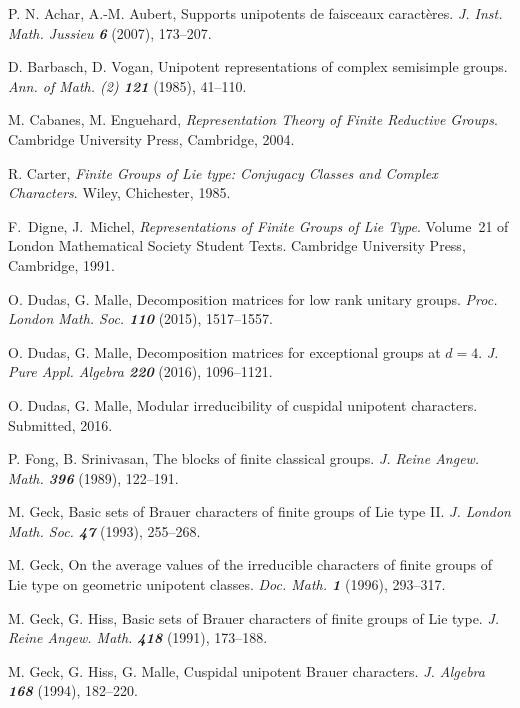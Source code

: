 \documentclass[12pt,leqno,a4paper]{amsart}
\theoremstyle{remark}
\begin{document}
\begin{thebibliography}{33}

{\sc P. N. Achar, A.-M. Aubert}, Supports unipotents de faisceaux
  caract\`eres. \emph{J. Inst. Math. Jussieu \bf6} (2007), 173--207.

{\sc D. Barbasch, D. Vogan}, Unipotent representations of complex semisimple
  groups. \emph{Ann. of Math. (2) \bf121} (1985), 41--110.

{\sc M. Cabanes, M. Enguehard}, \emph{Representation Theory of Finite
  Reductive Groups}. Cambridge University Press, Cambridge, 2004.

{\sc R. Carter}, \emph{Finite Groups of Lie type: Conjugacy Classes and
  Complex Characters}. Wiley, Chichester, 1985.

{\sc F.~Digne, J.~Michel}, \emph{Representations of Finite Groups of Lie
  Type}. Volume~21 of London Mathematical Society Student Texts. Cambridge
  University Press, Cambridge, 1991.

{\sc O. Dudas, G. Malle}, Decomposition matrices for low rank unitary groups.
  \emph{Proc. London Math. Soc. \bf110} (2015), 1517--1557.

{\sc O. Dudas, G. Malle}, Decomposition matrices for exceptional groups at
  $d=4$. \emph{J. Pure Appl. Algebra \bf220} (2016), 1096--1121.

{\sc O. Dudas, G. Malle}, Modular irreducibility of cuspidal unipotent
  characters. Submitted, 2016.

{\sc P. Fong, B. Srinivasan}, The blocks of finite classical groups.
  \emph{J. Reine Angew. Math. \bf396} (1989), 122--191.

{\sc M. Geck}, Basic sets of Brauer characters of finite groups of
  Lie type II. \emph{J. London Math. Soc. \bf47} (1993), 255--268.

{\sc M. Geck}, On the average values of the irreducible characters of finite
  groups of Lie type on geometric unipotent classes. \emph{Doc. Math. \bf1}
  (1996), 293--317.

{\sc M. Geck, G. Hiss}, Basic sets of Brauer characters of finite groups of
  Lie type. \emph{J. Reine Angew. Math. \bf418} (1991), 173--188.

{\sc M. Geck, G. Hiss, G. Malle}, Cuspidal unipotent Brauer characters.
  \emph{J. Algebra \bf168} (1994), 182--220.


\end{thebibliography}
\end{document}
